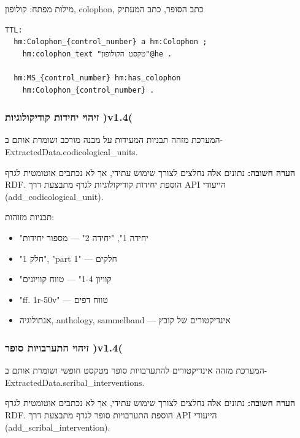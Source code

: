 \documentclass[12pt,a4paper]{article}
\begin{document}
מילות מפתח: קולופון, colophon, כתב הסופר, כתב המעתיק

\begin{LTR}
\begin{verbatim}
TTL:
  hm:Colophon_{control_number} a hm:Colophon ;
    hm:colophon_text "טקסט הקולופון"@he .
  
  hm:MS_{control_number} hm:has_colophon 
    hm:Colophon_{control_number} .
\end{verbatim}
\end{LTR}

\subsubsection{זיהוי יחידות קודיקולוגיות )v1.4(}

המערכת מזהה תבניות המעידות על מבנה מורכב ושומרת אותם ב-\textenglish{ExtractedData.codicological\_units}.

\textbf{הערה חשובה:} נתונים אלה נחלצים לצורך שימוש עתידי, אך לא נכתבים אוטומטית לגרף RDF. הוספת יחידות קודיקולוגיות לגרף מתבצעת דרך API הייעודי \textenglish{(add\_codicological\_unit)}.

תבניות מזוהות:
\begin{itemize}
\item "יחידה 1", "יחידה 2" — מספור יחידות
\item "חלק 1", "part 1" — חלקים
\item "קוויון 1-4" — טווח קוויונים
\item "ff. 1r-50v" — טווח דפים
\item אנתולוגיה, anthology, sammelband — אינדיקטורים של קובץ
\end{itemize}

\subsubsection{זיהוי התערבויות סופר )v1.4(}

המערכת מזהה אינדיקטורים להתערבויות סופר מטקסט חופשי ושומרת אותם ב-\textenglish{ExtractedData.scribal\_interventions}. 

\textbf{הערה חשובה:} נתונים אלה נחלצים לצורך שימוש עתידי, אך לא נכתבים אוטומטית לגרף RDF. הוספת התערבויות סופר לגרף מתבצעת דרך API הייעודי \textenglish{(add\_scribal\_intervention)}.
\end{document}
